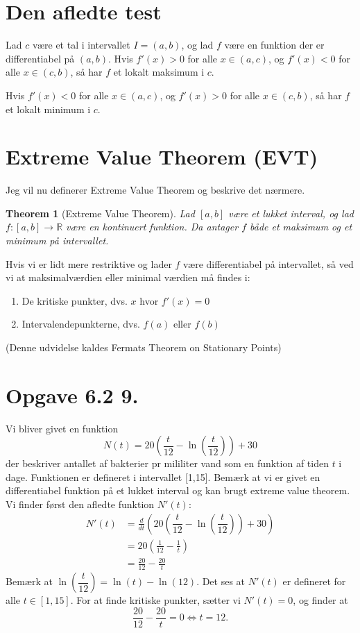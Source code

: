 \documentclass{article}
\newtheorem*{theorem*}{Theorem}
\theoremstyle{definition}
\theoremstyle{remark}
\begin{document}
\section*{Den afledte test}
Lad $c$ være et tal i intervallet $ I = (a,b)$, og lad $f$ være en funktion der er differentiabel på $(a,b)$. Hvis $f'(x) > 0$ for alle $x \in (a,c)$, og $f'(x) < 0$ for alle $x \in (c,b)$, så har $f$ et lokalt maksimum i $c$. \vspace{1em}

 Hvis $f'(x) < 0$ for alle $x \in (a,c)$, og $f'(x) > 0$ for alle $x \in (c,b)$, så har $f$ et lokalt minimum i $c$.

 \section*{Extreme Value Theorem (EVT)}
 Jeg vil nu definerer Extreme Value Theorem og beskrive det nærmere.

\begin{theorem*}[Extreme Value Theorem]
    Lad $[a,b]$ være et lukket interval, og lad
    $f:[a,b]\to\mathbb{R}$ være en kontinuert funktion.
    Da antager $f$ både et maksimum og et minimum på intervallet.
\end{theorem*}
Hvis vi er lidt mere restriktive og lader $f$ være differentiabel på intervallet, så ved vi at maksimalværdien eller minimal værdien må findes i:
\begin{enumerate}
    \item De kritiske punkter, dvs. $x$ hvor $f'(x) = 0$
    \item Intervalendepunkterne, dvs. $f(a)$ eller $f(b)$
\end{enumerate}
(Denne udvidelse kaldes Fermats Theorem on Stationary Points)

\section*{Opgave 6.2 9.}
Vi bliver givet en funktion
\begin{equation}
    N(t) = 20 (\dfrac{t}{12} - \ln(\dfrac{t}{12} )) + 30
\end{equation}
der beskriver antallet af bakterier pr mililiter vand som en funktion af tiden $t$ i dage. Funktionen er defineret i intervallet [1,15]. Bemærk at vi er givet en differentiabel funktion på et lukket interval og kan brugt extreme value theorem. \vspace{1em}
Vi finder først den afledte funktion $N'(t)$:
\begin{align*}
N'(t) &= \frac{d}{dt} \left( 20 (\dfrac{t}{12} - \ln(\dfrac{t}{12} )) + 30 \right) \\
&= 20 \left( \frac{1}{12} - \frac{1}{t} \right) \\
&= \frac{20}{12} - \frac{20}{t}
\end{align*}
Bemærk at $\ln(\dfrac{t}{12}) = \ln(t) - \ln(12)$. Det ses at $N'(t)$ er defineret for alle $t \in [1,15]$. For at finde kritiske punkter, sætter vi $N'(t) = 0$, og finder at
$$\frac{20}{12} - \frac{20}{t} = 0 \iff t = 12.$$
\end{document}
